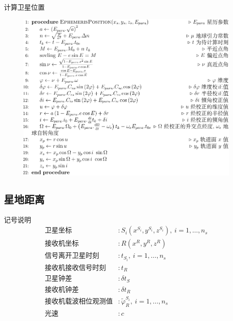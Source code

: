 \begin{frame}{计算卫星位置}
    \begin{figure}
        \centering
        \includegraphics[width = .7\textwidth]{pic/algo_ephemeris.pdf}
        \label{fig:alg_ephemeris}
    \end{figure}
\end{frame}

\subsection{星地距离}
\begin{frame}{记号说明}
    \begin{align*}
        \text{卫星坐标} &: S _ i \left( x ^ { S _ i }, y ^ { S _ i }, z ^ { S _ i } \right), \ i = 1, \ldots, n _ s \\
        \text{接收机坐标} &: R \left( x ^ R, y ^ R, z ^ R \right) \\
        \text{信号离开卫星时刻} &: t _ { S _ i }, \ i = 1, \ldots, n _ s \\
        \text{接收机接收信号时刻} &: t _ R \\
        \text{卫星钟差} &: \delta t _ S \\
        \text{接收机钟差} &: \delta t _ R \\
        \text{接收机载波相位观测值} &: \tilde \varphi _ R ^ { S _ i }, \ i = 1, \ldots, n _ s \\
        \text{光速} &: c
    \end{align*}
\end{frame}


